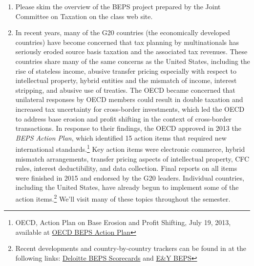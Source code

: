 \begin{enumerate}
	\item Please skim the overview of the BEPS project prepared by the Joint Committee on Taxation on the class web site.
	\item In recent years, many of the G20 countries (the economically developed countries) have become concerned that tax planning by multinationals has seriously eroded source basis taxation and the associated tax revenues.  These countries share many of the same concerns as the United States, including the rise of stateless income, abusive transfer pricing especially with respect to intellectual property, hybrid entities and the mismatch of income, interest stripping, and abusive use of treaties. The OECD became concerned that unilateral responses by OECD members could result in double taxation  and increased tax uncertainty for cross-border investments, which led the OECD to address base erosion and profit shifting in the context of cross-border transactions.  In response to their findings, the OECD approved in 2013 the \emph{BEPS Action Plan}, which identified 15 action items that required new international standards.\footnote{OECD, Action Plan on Base Erosion and Profit Shifting, July 19, 2013, available at \href{http://www.oecd.org/tax/action-plan-on-base-erosion-and-profit-shifting-9789264202719-en.htm}{OECD BEPS Action Plan}}  Key action items were electronic commerce, hybrid mismatch arrangements, transfer pricing aspects of intellectual property, CFC rules, interest deductibility, and data collection.  Final reports on all items were finished in 2015 and endorsed by the G20 leaders.  Individual countries, including the United States, have already begun to implement some of the action items.\footnote{Recent developments and country-by-country trackers can be found in at the following links:   \href{http://www2.deloitte.com/global/en/pages/tax/articles/beps-country-scorecards.html}{Deloitte BEPS Scorecards} and \href{http://www.ey.com/GL/en/Services/Tax/OECD-base-erosion-and-profit-shifting-project}{E\&Y BEPS} } We'll visit many of these topics throughout the semester.

\end{enumerate}

